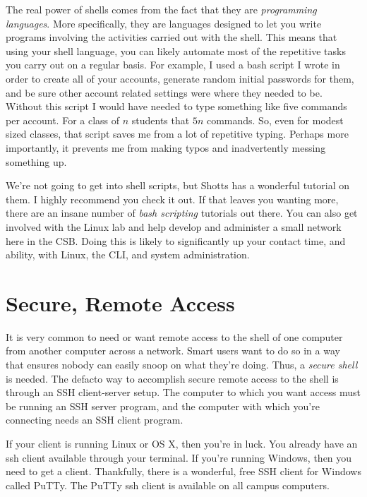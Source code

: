 \documentclass[]{tufte-handout}
\begin{document}
The real power of shells comes from the fact that they are \textit{programming languages}.  More specifically, they are languages designed to let you write programs involving the activities carried out with the shell.  This means that using your shell language, you can likely automate most of the repetitive tasks you carry out on a regular basis.  For example, I used a bash script I wrote in order to create all of your accounts, generate random initial passwords for them, and be sure other account related settings were where they needed to be.  Without this script I would have needed to type something like five commands per account. For a class of $n$ students that $5n$ commands.  So, even for modest sized classes, that script saves me from a lot of repetitive typing. Perhaps more importantly, it prevents me from making typos and inadvertently messing something up. 

We're not going to get into shell scripts, but Shotts has a wonderful tutorial on them. I highly recommend you check it out.  If that leaves you wanting more, there are an insane number of \textit{bash scripting} tutorials out there.  You can also get involved with the Linux lab and help develop and administer a small network here in the CSB.  Doing this is likely to significantly up your contact time, and ability, with Linux, the CLI, and system administration.

\section{Secure, Remote Access} 

It is very common to need or want remote access to the shell of one computer from another computer across a network. Smart users want to do so in a way that ensures nobody can easily snoop on what they're doing. Thus, a \textit{secure shell} is needed. The defacto way to accomplish secure remote access to the shell is through an SSH client-server setup.  The computer to which you want access must be running an SSH server program, and the computer with which you're connecting needs an SSH client program.  

If your client is running Linux or OS X, then you're in luck. You already have an ssh client available through your terminal.  If you're running Windows, then you need to get a client. Thankfully, there is a wonderful, free SSH client for Windows called PuTTy.  The PuTTy ssh client is available on all campus computers. 
\end{document}
